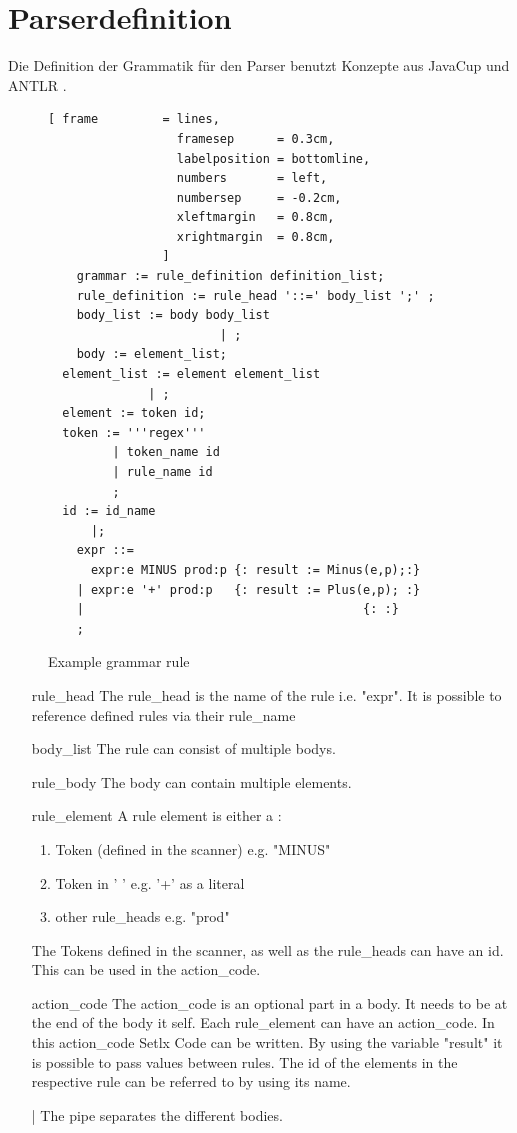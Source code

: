 \section{Parserdefinition}
Die Definition der Grammatik für den Parser benutzt Konzepte aus JavaCup und ANTLR .
\begin{figure}[!ht]
\begin{Verbatim}[ frame         = lines, 
                  framesep      = 0.3cm, 
                  labelposition = bottomline,
                  numbers       = left,
                  numbersep     = -0.2cm,
                  xleftmargin   = 0.8cm,
                  xrightmargin  = 0.8cm,
                ]
	grammar := rule_definition definition_list;
	rule_definition := rule_head '::=' body_list ';' ;
	body_list := body body_list
						| ;
	body := element_list;
  element_list := element element_list
              | ;
  element := token id;
  token := '''regex''' 
         | token_name id
         | rule_name id
         ;
  id := id_name
      |;
	expr ::= 
	  expr:e MINUS prod:p {: result := Minus(e,p);:} 
	| expr:e '+' prod:p   {: result := Plus(e,p); :} 
	| 										{: :}
	;
\end{Verbatim}
\caption{Example grammar rule}
\label{fig:example_grammer}
\end{figure}
\begin{itemize}
	\item[rule\_head] The rule\_head is the name of the rule i.e. "expr". It is possible to reference defined rules via their rule\_name
	\item[body\_list] The rule can consist of multiple bodys.
	\item[rule\_body] The body can contain multiple elements. 
	\item[rule\_element] A rule element is either a :
	\begin{enumerate}
		\item Token (defined in the scanner) e.g. "MINUS"
		\item Token in  ' ' e.g. '+' as a literal
		\item other rule\_heads e.g. "prod"
	\end{enumerate}
	The Tokens defined in the scanner, as well as the rule\_heads can have an id. This can be used in the action\_code.
	\item[action\_code] The action\_code is an optional part in a body. It needs to be at the end of the body it self. Each rule\_element can have an action\_code. In this action\_code Setlx Code can be written. By using the variable "result" it is possible to pass values between rules. The id of the elements in the respective rule can be referred to by using its name.
	\item[|] The pipe separates the different bodies.
\end{itemize}
\newpage
